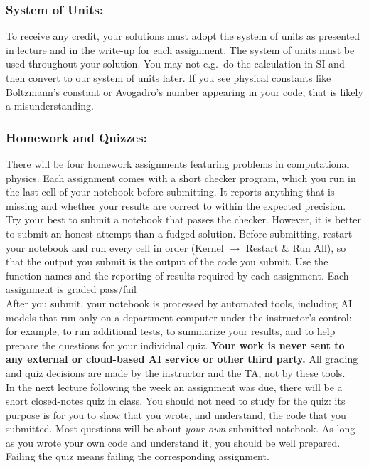 \documentclass[12pt]{article}
\begin{document}
\subsubsection*{System of Units:}

To receive any credit, your solutions must adopt the system of units
as presented in lecture and in the write-up for each assignment.  The
system of units must be used throughout your solution.  You may not
e.g.\ do the calculation in SI and then convert to our system of units
later.  If you see physical constants like Boltzmann's constant or
Avogadro's number appearing in your code, that is likely a
misunderstanding.

\subsubsection*{Homework and Quizzes:}

There will be four homework assignments featuring problems in
computational physics. Each assignment comes with a short checker
program, which you run in the last cell of your notebook before
submitting. It reports anything that is missing and whether your
results are correct to within the expected precision.  Try your best
to submit a notebook that passes the checker.  However, it is better
to submit an honest attempt than a fudged solution.  Before
submitting, restart your notebook and run every cell in order (Kernel
$\rightarrow$ Restart \& Run All), so that the output you submit is
the output of the code you submit.  Use the function names and the
reporting of results required by each assignment. Each assignment is
graded pass/fail\\[3pt]

\noindent
After you submit, your notebook is processed by automated tools,
including AI models that run only on a department computer under the
instructor's control: for example, to run additional tests, to
summarize your results, and to help prepare the questions for your
individual quiz.  {\bf Your work is never sent to any external or
  cloud-based AI service or other third party.}  All grading and quiz
decisions are made by the instructor and the TA, not by these
tools.\\[3pt]

\noindent
In the next lecture following the week an assignment was due, there
will be a short closed-notes quiz in class.  You should not need to
study for the quiz: its purpose is for you to show that you wrote, and
understand, the code that you submitted.  Most questions will be about
{\em your own} submitted notebook. As long as you wrote your own code
and understand it, you should be well prepared.  Failing the quiz
means failing the corresponding assignment.
\end{document}
